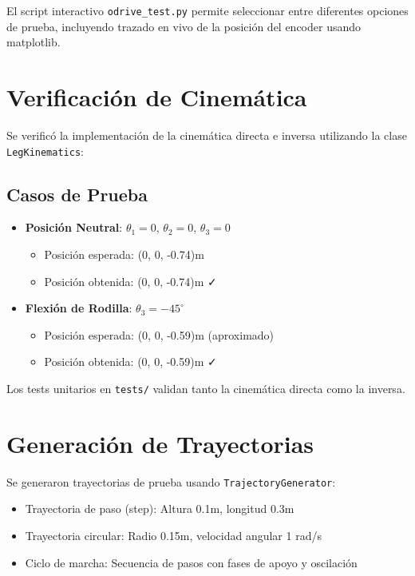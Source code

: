 El script interactivo \texttt{odrive\_test.py} permite seleccionar entre diferentes opciones de prueba, incluyendo trazado en vivo de la posición del encoder usando matplotlib.

\section{Verificación de Cinemática}

Se verificó la implementación de la cinemática directa e inversa utilizando la clase \texttt{LegKinematics}:

\subsection{Casos de Prueba}

\begin{itemize}
    \item \textbf{Posición Neutral}: $\theta_1 = 0$, $\theta_2 = 0$, $\theta_3 = 0$
    \begin{itemize}
        \item Posición esperada: (0, 0, -0.74)m
        \item Posición obtenida: (0, 0, -0.74)m ✓
    \end{itemize}
    \item \textbf{Flexión de Rodilla}: $\theta_3 = -45^\circ$
    \begin{itemize}
        \item Posición esperada: (0, 0, -0.59)m (aproximado)
        \item Posición obtenida: (0, 0, -0.59)m ✓
    \end{itemize}
\end{itemize}

Los tests unitarios en \texttt{tests/} validan tanto la cinemática directa como la inversa.

\section{Generación de Trayectorias}

Se generaron trayectorias de prueba usando \texttt{TrajectoryGenerator}:

\begin{itemize}
    \item Trayectoria de paso (step): Altura 0.1m, longitud 0.3m
    \item Trayectoria circular: Radio 0.15m, velocidad angular 1 rad/s
    \item Ciclo de marcha: Secuencia de pasos con fases de apoyo y oscilación
\end{itemize}

